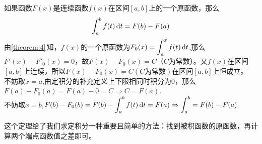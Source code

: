 \theorem[微积分基本定理]
\label{theorem:4.8}
如果函数$F(x)$是连续函数$f(x)$在区间$[a,b]$上的一个原函数，那么
\begin{equation}
	\int_{a}^{b}f(t)\,{\rm{d}} t=F(b)-F(a)
\end{equation}
\proof 由\ref{theorem:4}$\,$知，$f(x)$的一个原函数为$\displaystyle F_0(x)=\int_{a}^{x}f(t)\,{\rm{d}} t$,那么$F'(x)-F'_0(x)=0$，故$F(x)-F_0(x)=C$（$C$为常数）。又$f(x)$在区间$[a,b]$上连续，所以$F(x)-F_0(x)=C(C\text{为常数})$在区间$[a,b]$上恒成立。\\[0.5em]
\hspace*{2em} 不妨取$x=a$,由定积分的补充定义上下限相同时积分为0，那么$F(a)-F_0(a)=F(a)-0=C\Rightarrow C=F(a)$.\\[0.5em]
不妨取$x=b$,$\displaystyle F(b)-F_0(b)=F(b)-\int_{a}^{b}f(t)\,{\rm{d}} t=F(a) \Rightarrow \int_{a}^{b}=F(b)-F(a)$.
\vspace*{0.5em}

这个定理给了我们求定积分一种重要且简单的方法：找到被积函数的原函数，再计算两个端点函数值之差即可。

\vspace*{1.5em}

